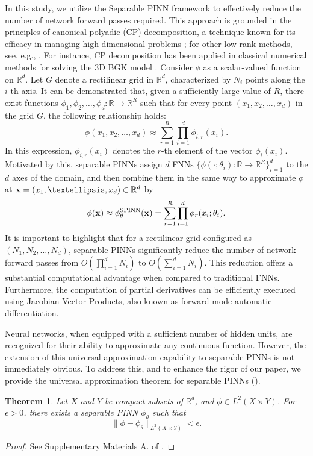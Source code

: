 \documentclass[preprint,12pt]{elsarticle}
\newtheorem{theorem}{Theorem}
\begin{document}
In this study, we utilize the Separable PINN framework \cite{cho2024separable} to effectively reduce the number of network forward passes required.
This approach is grounded in the principles of canonical polyadic (CP) decomposition, a technique known for its efficacy in managing high-dimensional problems \cite{hitchcock1927expression}; for other low-rank methods, see, e.g., \cite{guo2023local, GQ24}.
For instance, CP decomposition has been applied in classical numerical methods for solving the 3D BGK model \cite{boelens2020tensor}.
Consider $\phi$ as a scalar-valued function on $\mathbb{R}^d$.
Let $G$ denote a rectilinear grid in $\mathbb{R}^d$, characterized by $N_i$ points along the $i$-th axis.
It can be demonstrated that, given a sufficiently large value of $R$, there exist functions $\phi_1, \phi_2, \dots, \phi_d: \mathbb{R} \rightarrow \mathbb{R}^R$ such that for every point $(x_1, x_2, \dots, x_d)$ in the grid $G$, the following relationship holds: 
\[
    \phi(x_1, x_2, \dots, x_d) \approx \sum_{r=1}^R \prod_{i=1}^d \phi_{i,r}(x_i).
\]
In this expression, $\phi_{i,r}(x_i)$ denotes the $r$-th element of the vector $\phi_i(x_i)$.
Motivated by this, separable PINNs assign $d$ FNNs $\{ \phi(\cdot; \theta_i): \mathbb{R} \rightarrow \mathbb{R}^R \}_{i=1}^d$ to the $d$ axes of the domain, and then combine them in the same way to approximate $\phi$ at ${\bf x} = (x_1, \dots, x_d)\in \mathbb{R}^d$ by
\[
    \phi({\bf x}) \approx \phi_\theta^\mathrm{SPINN}({\bf x}) = \sum_{r=1}^R \prod_{i=1}^d \phi_r(x_i; \theta_i).
\]
It is important to highlight that for a rectilinear grid configured as $(N_1, N_2, \dots, N_d)$, separable PINNs significantly reduce the number of network forward passes from $O\left( \prod_{i=1}^d N_i \right)$ to $O\left(\sum_{i=1}^d N_i\right)$. This reduction offers a substantial computational advantage when compared to traditional FNNs.
Furthermore, the computation of partial derivatives can be efficiently executed using Jacobian-Vector Products, also known as forward-mode automatic differentiation.


Neural networks, when equipped with a sufficient number of hidden units, are recognized for their ability to approximate any continuous function.
However, the extension of this universal approximation capability to separable PINNs is not immediately obvious.
To address this, and to enhance the rigor of our paper, we provide the universal approximation theorem for separable PINNs ().


\begin{theorem}\label{thm:uat_spinn}
Let $X$ and $Y$ be compact subsets of $\mathbb{R}^d$, and $\phi \in L^2 (X\times Y)$.
For $\epsilon >0$, there exists a separable PINN $\phi_\theta$ such that
\[
    \| \phi - \phi_\theta \|_{L^2(X\times Y)} < \epsilon.
\]
\end{theorem}
\begin{proof}
    See Supplementary Materials A. of \cite{cho2024separable}.
\end{proof}
\end{document}

